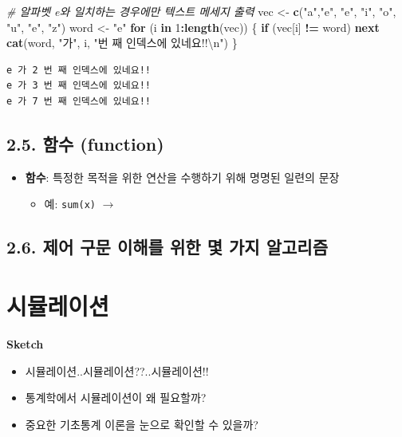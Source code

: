 \documentclass[
  11pt,
]{krantz}
\makeatletter
\newenvironment{Shaded}{\begin{snugshade}}{\end{snugshade}}
\newcommand{\CharTok}[1]{\textcolor[rgb]{0.5,0.5,0.5}{#1}}
\newcommand{\CommentTok}[1]{\textcolor[rgb]{0.37,0.37,0.37}{\textit{#1}}}
\newcommand{\ControlFlowTok}[1]{\textcolor[rgb]{0.27,0.27,0.27}{\textbf{#1}}}
\newcommand{\DecValTok}[1]{\textcolor[rgb]{0.06,0.06,0.06}{#1}}
\newcommand{\KeywordTok}[1]{\textcolor[rgb]{0.27,0.27,0.27}{\textbf{#1}}}
\newcommand{\NormalTok}[1]{#1}
\newcommand{\OperatorTok}[1]{\textcolor[rgb]{0.43,0.43,0.43}{\textbf{#1}}}
\newcommand{\StringTok}[1]{\textcolor[rgb]{0.5,0.5,0.5}{#1}}
\providecommand{\tightlist}{%
  \setlength{\itemsep}{0pt}\setlength{\parskip}{0pt}}
\newenvironment{kframe}{%
\medskip{}
\setlength{\fboxsep}{.8em}
 \def\at@end@of@kframe{}%
 \ifinner\ifhmode%
  \def\at@end@of@kframe{\end{minipage}}%
  \begin{minipage}{\columnwidth}%
 \fi\fi%
 \def\FrameCommand##1{\hskip\@totalleftmargin \hskip-\fboxsep
 \colorbox{shadecolor}{##1}\hskip-\fboxsep
     \hskip-\linewidth \hskip-\@totalleftmargin \hskip\columnwidth}%
 \MakeFramed {\advance\hsize-\width
   \@totalleftmargin\z@ \linewidth\hsize
   \@setminipage}}%
 {\par\unskip\endMakeFramed%
 \at@end@of@kframe}
\renewenvironment{quote}{\begin{kframe}}{\end{kframe}}
\makeatother
\begin{document}
\begin{Shaded}
\begin{Highlighting}[]
\CommentTok{# 알파벳 e와 일치하는 경우에만 텍스트 메세지 출력}
\NormalTok{vec <-}\StringTok{ }\KeywordTok{c}\NormalTok{(}\StringTok{"a"}\NormalTok{,}\StringTok{"e"}\NormalTok{, }\StringTok{"e"}\NormalTok{, }\StringTok{"i"}\NormalTok{, }\StringTok{"o"}\NormalTok{, }\StringTok{"u"}\NormalTok{, }\StringTok{"e"}\NormalTok{, }\StringTok{"z"}\NormalTok{)}
\NormalTok{word <-}\StringTok{ "e"}
\ControlFlowTok{for}\NormalTok{ (i }\ControlFlowTok{in} \DecValTok{1}\OperatorTok{:}\KeywordTok{length}\NormalTok{(vec)) \{}
  \ControlFlowTok{if}\NormalTok{ (vec[i] }\OperatorTok{!=}\StringTok{ }\NormalTok{word) }\ControlFlowTok{next}
  \KeywordTok{cat}\NormalTok{(word, }\StringTok{"가"}\NormalTok{, i, }\StringTok{"번 째 인덱스에 있네요!!}\CharTok{\textbackslash{}n}\StringTok{"}\NormalTok{)}
\NormalTok{\}}
\end{Highlighting}
\end{Shaded}

\begin{verbatim}
e 가 2 번 째 인덱스에 있네요!!
e 가 3 번 째 인덱스에 있네요!!
e 가 7 번 째 인덱스에 있네요!!
\end{verbatim}

\normalsize

\hypertarget{function}{%
\section{2.5. 함수 (function)}\label{function}}

\begin{itemize}
\tightlist
\item
  \textbf{함수}: 특정한 목적을 위한 연산을 수행하기 위해 명명된 일련의 문장

  \begin{itemize}
  \tightlist
  \item
    예: \texttt{sum(x)} \(\rightarrow\)
  \end{itemize}
\end{itemize}

\hypertarget{uxc81cuxc5b4-uxad6cuxbb38-uxc774uxd574uxb97c-uxc704uxd55c-uxba87-uxac00uxc9c0-uxc54cuxace0uxb9acuxc998}{%
\section{2.6. 제어 구문 이해를 위한 몇 가지 알고리즘}\label{uxc81cuxc5b4-uxad6cuxbb38-uxc774uxd574uxb97c-uxc704uxd55c-uxba87-uxac00uxc9c0-uxc54cuxace0uxb9acuxc998}}

\hypertarget{Simulation}{%
\chapter{시뮬레이션}\label{Simulation}}

\begin{quote}
\textbf{Sketch}

\begin{itemize}
\tightlist
\item
  시뮬레이션..시뮬레이션??..시뮬레이션!!
\item
  통계학에서 시뮬레이션이 왜 필요할까?
\item
  중요한 기초통계 이론을 눈으로 확인할 수 있을까?
\end{itemize}
\end{quote}

  

\printindex
\end{document}
